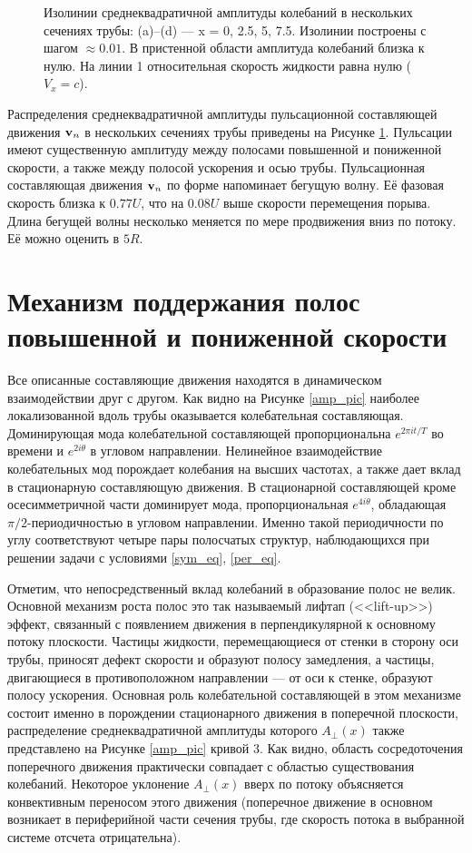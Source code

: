 \begin{figure}[h]
\caption{Изолинии среднеквадратичной амплитуды колебаний в нескольких сечениях трубы: (a)--(d) --- x = 0, 2.5, 5, 7.5. Изолинии построены с шагом $\approx 0.01$. В пристенной области амплитуда колебаний близка к нулю. На линии 1 относительная скорость жидкости равна нулю ($V_{x} = c$).}
\label{puls_cs_pic}
\end{figure}

Распределения среднеквадратичной амплитуды пульсационной составляющей движения $\mathbf{v}_n$ в нескольких сечениях трубы приведены на Рисунке \ref{puls_cs_pic}. Пульсации имеют существенную амплитуду между полосами повышенной и пониженной скорости, а также между полосой ускорения и осью трубы. Пульсационная составляющая движения $\mathbf{v}_n$ по форме напоминает бегущую волну. Её фазовая скорость близка к $0.77U$, что на $0.08U$ выше скорости перемещения порыва. Длина бегущей волны несколько меняется по мере продвижения вниз по потоку. Её можно оценить в $5R$. 


\section{Механизм поддержания полос повышенной и пониженной скорости} 

Все описанные составляющие движения находятся в динамическом взаимодействии друг с другом. Как видно на Рисунке \ref{amp_pic} наиболее локализованной вдоль трубы оказывается колебательная составляющая. Доминирующая мода колебательной составляющей пропорциональна $e^{2\pi it/T}$ во времени и $e^{2i\theta}$ в угловом направлении. Нелинейное взаимодействие колебательных мод порождает колебания на высших частотах, а также дает вклад в стационарную составляющую движения. В стационарной составляющей кроме осесимметричной части доминирует мода, пропорциональная $e^{4i\theta}$, обладающая $\pi/2$-периодичностью в угловом направлении. Именно такой периодичности по углу соответствуют четыре пары полосчатых структур, наблюдающихся при решении задачи с условиями \eqref{sym_eq}, \eqref{per_eq}.

Отметим, что непосредственный вклад колебаний в образование полос не велик. Основной механизм роста полос это так называемый лифтап (<<lift-up>>) эффект, связанный с появлением движения в перпендикулярной к основному потоку плоскости. Частицы жидкости, перемещающиеся от стенки в сторону оси трубы, приносят дефект скорости и образуют полосу замедления, а частицы, двигающиеся в противоположном направлении --- от оси к стенке, образуют полосу ускорения. Основная роль колебательной составляющей в этом механизме состоит именно в порождении стационарного движения в поперечной плоскости, распределение среднеквадратичной амплитуды которого $A_{\perp}(x)$ также представлено на Рисунке \ref{amp_pic} кривой 3. Как видно, область сосредоточения поперечного движения практически совпадает с областью существования колебаний. Некоторое уклонение $A_{\perp}(x)$ вверх по потоку объясняется конвективным переносом этого движения (поперечное движение в основном возникает в периферийной части сечения трубы, где скорость потока в выбранной системе отсчета отрицательна).

